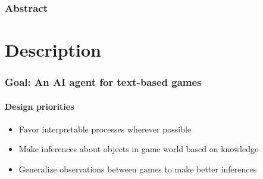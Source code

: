 \begin{frame}
    \frametitle{Abstract}
    
\end{frame}

\section{Description}

\begin{frame}
    \frametitle{Goal: An AI agent for text-based games}
    \framesubtitle{Design priorities}
    \begin{itemize}
        \item Favor interpretable processes wherever possible
        \item Make inferences about objects in game world based on
            knowledge
        \item Generalize observations between games to make better
            inferences
    \end{itemize}
\end{frame}

